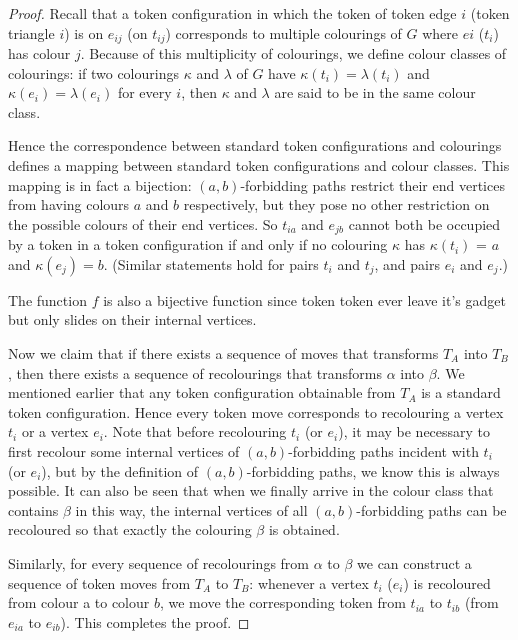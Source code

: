 \begin{proof}
  Recall that a token configuration in which the token of token edge $i$ (token triangle $i$) is on $e_{ij}$ (on $t_ {ij}$) corresponds
  to multiple colourings of $G$ where $ei$ ($t_i$) has colour $j$. Because of this multiplicity of colourings, we define colour classes of
  colourings: if two colourings $\kappa$ and $\lambda$ of $G$ have $\kappa(t_i) = \lambda(t_i)$ and $\kappa(e_i) = \lambda(e_i)$ for every $i$,
  then $\kappa$ and $\lambda$ are said to be in the same colour class.

  Hence the correspondence between standard token configurations and colourings defines a mapping between standard
  token configurations and colour classes. This mapping is in fact a bijection: $(a, b)$-forbidding paths restrict their end vertices
  from having colours $a$ and $b$ respectively, but they pose no other restriction on the possible colours of their end vertices.
  So $t_{ia}$ and $e_{jb}$ cannot both be occupied by a token in a token configuration if and only if no colouring $\kappa$ has $\kappa(t_i)$ = $a$
  and $\kappa(e_j) = b$. (Similar statements hold for pairs $t_i$ and $t_j$, and pairs $e_i$ and $e_j$.)

  The function $f$ is also a bijective function since token token ever leave it's gadget but only slides on their internal vertices.

  Now we claim that if there exists a sequence of moves that transforms $T_A$ into $T_B$, then there exists a sequence of
  recolourings that transforms $\alpha$ into $\beta$. We mentioned earlier that any token configuration obtainable from $T_A$ is a standard
  token configuration. Hence every token move corresponds to recolouring a vertex $t_i$ or a vertex $e_i$. Note that before
  recolouring $t_i$ (or $e_i$), it may be necessary to first recolour some internal vertices of $(a, b)$-forbidding paths incident with
  $t_i$ (or $e_i$), but by the definition of $(a, b)$-forbidding paths, we know this is always possible. It can also be seen that when
  we finally arrive in the colour class that contains $\beta$ in this way, the internal vertices of all $(a, b)$-forbidding paths can be
  recoloured so that exactly the colouring $\beta$ is obtained.

  Similarly, for every sequence of recolourings from $\alpha$ to $\beta$ we can construct a sequence of token moves from $T_A$ to $T_B$:
  whenever a vertex $t_i$ ($e_i$) is recoloured from colour a to colour $b$, we move the corresponding token from $t_{ia}$ to $t_{ib}$
  (from $e_ {ia}$ to $e_{ib}$). This completes the proof.


\end{proof}

